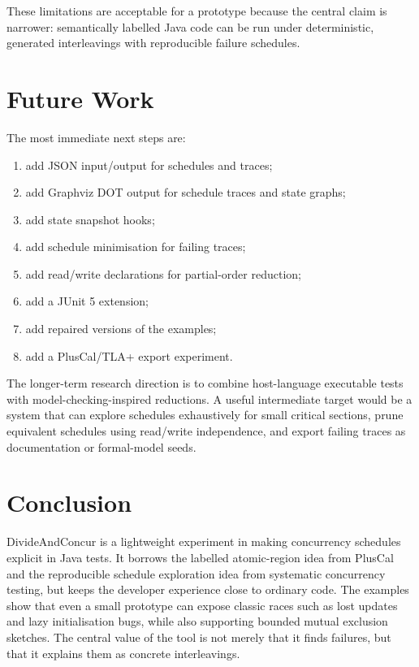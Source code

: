 \documentclass[11pt]{article}
\begin{document}
These limitations are acceptable for a prototype because the central claim is narrower: semantically labelled Java code can be run under deterministic, generated interleavings with reproducible failure schedules.

\section{Future Work}

The most immediate next steps are:

\begin{enumerate}[nosep]
  \item add JSON input/output for schedules and traces;
  \item add Graphviz DOT output for schedule traces and state graphs;
  \item add state snapshot hooks;
  \item add schedule minimisation for failing traces;
  \item add read/write declarations for partial-order reduction;
  \item add a JUnit 5 extension;
  \item add repaired versions of the examples;
  \item add a PlusCal/TLA+ export experiment.
\end{enumerate}

The longer-term research direction is to combine host-language executable tests with model-checking-inspired reductions. A useful intermediate target would be a system that can explore schedules exhaustively for small critical sections, prune equivalent schedules using read/write independence, and export failing traces as documentation or formal-model seeds.

\section{Conclusion}

DivideAndConcur is a lightweight experiment in making concurrency schedules explicit in Java tests. It borrows the labelled atomic-region idea from PlusCal and the reproducible schedule exploration idea from systematic concurrency testing, but keeps the developer experience close to ordinary code. The examples show that even a small prototype can expose classic races such as lost updates and lazy initialisation bugs, while also supporting bounded mutual exclusion sketches. The central value of the tool is not merely that it finds failures, but that it explains them as concrete interleavings.
\end{document}
